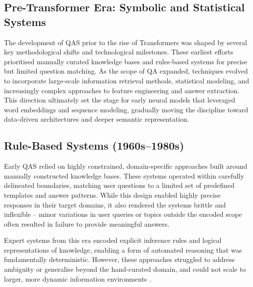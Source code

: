 \begin{spacing}{1.5}
\section{Pre-Transformer Era: Symbolic and Statistical Systems}
The development of QAS prior to the rise of Transformers was shaped by several key methodological shifts and technological milestones. These earliest efforts prioritised manually curated knowledge bases and rules-based systems for precise but limited question matching. As the scope of QA expanded, techniques evolved to incorporate large-scale information retrieval methods, statistical modeling, and increasingly complex approaches to feature engineering and answer extraction. This direction ultimately set the stage for early neural models that leveraged word embeddings and sequence modeling, gradually moving the discipline toward data-driven architectures and deeper semantic representation.

\subsection{Rule-Based Systems (1960s--1980s)}
Early QAS relied on highly constrained, domain-specific approaches built around manually constructed knowledge bases. These systems operated within carefully delineated boundaries, matching user questions to a limited set of predefined templates and answer patterns. While this design enabled highly precise responses in their target domains, it also rendered the systems brittle and inflexible -- minor variations in user queries or topics outside the encoded scope often resulted in failure to provide meaningful answers.

Expert systems from this era encoded explicit inference rules and logical representations of knowledge, enabling a form of automated reasoning that was fundamentally deterministic. However, these approaches struggled to address ambiguity or generalise beyond the hand-curated domain, and could not scale to larger, more dynamic information environments \citep{noauthor_question_2025, jurafsky_chapter_2024}.


\end{spacing}
